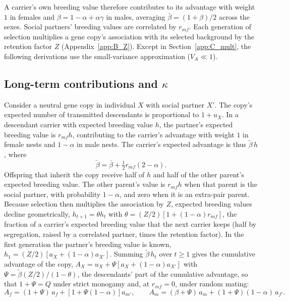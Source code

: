 \documentclass{article}
\begin{document}
A carrier's own breeding value therefore contributes to its advantage with weight $1$ in females and $\beta = 1 - \alpha + \alpha\gamma$ in males, averaging $\bar{\beta} = (1+\beta)/2$ across the sexes. Social partners' breeding values are correlated by $r_{mf}$. Each generation of selection multiplies a gene copy's association with its selected background by the retention factor $Z$ (Appendix~\ref{app:B_Z}). Except in Section~\ref{app:C_mult}, the following derivations use the small-variance approximation ($V_A \ll 1$).

\subsection{Long-term contributions and \texorpdfstring{$\kappa$}{kappa}}\label{app:C_kappa}
Consider a neutral gene copy in individual $X$ with social partner $X'$. The copy's expected number of transmitted descendants is proportional to $1 + u_X$. In a descendant carrier with expected breeding value $h$, the partner's expected breeding value is $r_{mf}h$, contributing to the carrier's advantage with weight $1$ in female nests and $1 - \alpha$ in male nests. The carrier's expected advantage is thus $\tilde{\beta}\,h$, where
\begin{equation}
    \tilde{\beta} = \bar{\beta} + \tfrac12 r_{mf}(2 - \alpha).
\end{equation}
Offspring that inherit the copy receive half of $h$ and half of the other parent's expected breeding value. The other parent's value is $r_{mf}h$ when that parent is the social partner, with probability $1 - \alpha$, and zero when it is an extra-pair parent. Because selection then multiplies the association by $Z$, expected breeding values decline geometrically, $h_{t+1} = \theta h_t$ with $\theta = (Z/2)[1 + (1-\alpha)r_{mf}]$, the fraction of a carrier's expected breeding value that the next carrier keeps (half by segregation, raised by a correlated partner, times the retention factor). In the first generation the partner's breeding value is known, $h_1 = (Z/2)[a_X + (1-\alpha)a_{X'}]$. Summing $\tilde{\beta}\,h_t$ over $t \ge 1$ gives the cumulative advantage of the copy, $A_X = u_X + \Psi[a_X + (1-\alpha)a_{X'}]$ with $\Psi = \tilde{\beta}(Z/2)/(1-\theta)$, the descendants' part of the cumulative advantage, so that $1 + \Psi = Q$ under strict monogamy and, at $r_{mf} = 0$, under random mating:
\begin{equation}
    A_f = (1+\Psi)\,a_f + \left[1 + \Psi(1-\alpha)\right] a_{m'}, \qquad
    A_m = (\beta+\Psi)\,a_m + (1+\Psi)(1-\alpha)\,a_{f'}. \label{eq:C_L}
\end{equation}
\end{document}

